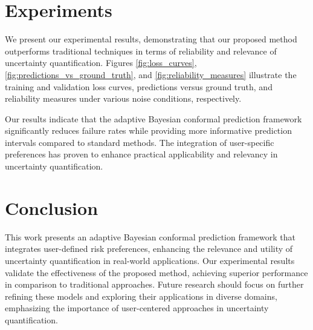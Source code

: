 \documentclass{article} %
\begin{document}
\section{Experiments}
\label{sec:experiments}
We present our experimental results, demonstrating that our proposed method outperforms traditional techniques in terms of reliability and relevance of uncertainty quantification. Figures \ref{fig:loss_curves}, \ref{fig:predictions_vs_ground_truth}, and \ref{fig:reliability_measures} illustrate the training and validation loss curves, predictions versus ground truth, and reliability measures under various noise conditions, respectively. 




Our results indicate that the adaptive Bayesian conformal prediction framework significantly reduces failure rates while providing more informative prediction intervals compared to standard methods. The integration of user-specific preferences has proven to enhance practical applicability and relevancy in uncertainty quantification.

\section{Conclusion}
\label{sec:conclusion}
This work presents an adaptive Bayesian conformal prediction framework that integrates user-defined risk preferences, enhancing the relevance and utility of uncertainty quantification in real-world applications. Our experimental results validate the effectiveness of the proposed method, achieving superior performance in comparison to traditional approaches. Future research should focus on further refining these models and exploring their applications in diverse domains, emphasizing the importance of user-centered approaches in uncertainty quantification.







\end{document}
